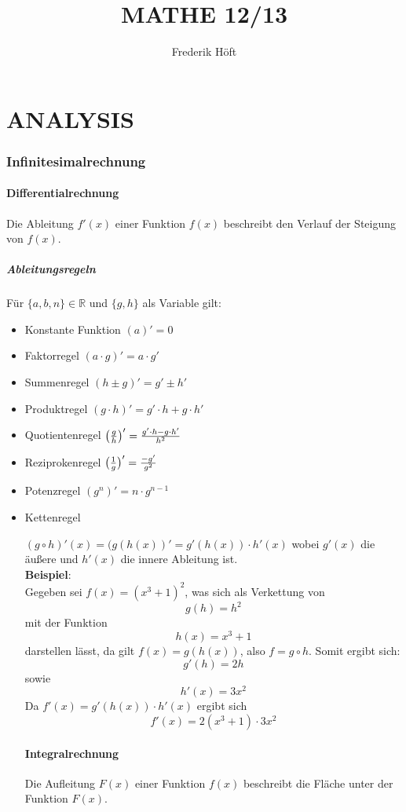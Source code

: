 \documentclass[a4paper,12pt]{article}
\begin{document}
\author{Frederik Höft}
\title{MATHE 12/13}
\maketitle
\pagebreak
\tableofcontents{}
\pagebreak
\part{ANALYSIS}
\section{Infinitesimalrechnung}
\subsection{Differentialrechnung}
Die Ableitung $f'(x)$ einer Funktion $f(x)$ beschreibt den Verlauf der Steigung von $f(x)$.
\subsubsection{Ableitungsregeln}
Für $\{a,b,n\} \in \mathbb{R}$ und $\{g,h\}$ als Variable gilt:
\begin{itemize}
\item Konstante Funktion
	\subitem $(a)' = 0$
\item Faktorregel
	\subitem $(a \cdot g)' = a \cdot g'$
\item Summenregel
	\subitem $(h \pm g)' = g' \pm h'$
\item Produktregel
	\subitem $(g \cdot h)' = g' \cdot h + g \cdot h'$
\item Quotientenregel
	\subitem $\big{(}\frac{g}{h}\big{)}' = \frac{g' \cdot h - g \cdot h'}{h^2}$
\item Reziprokenregel
	\subitem $\big{(}\frac{1}{g}\big{)}' = \frac{-g'}{g^2}$
\item Potenzregel
	\subitem $(g^n)' = n \cdot g^{n-1}$
\item Kettenregel
	\subitem \parbox[t]{\linewidth}{$(g \circ h)'(x) = (g(h(x))' = g'(h(x)) \cdot h'(x)$
		wobei $g'(x)$ die äußere und $h'(x)$ die innere Ableitung ist.\\
		\textbf{Beispiel}:\\
		Gegeben sei $f(x) = (x^3 + 1)^2$, was sich als Verkettung von
		$$g(h) = h^2$$
		mit der Funktion
		$$h(x) = x^3 + 1$$
		darstellen lässt, da gilt $f(x) = g(h(x))$, also $f = g \circ h$. Somit ergibt sich:
		$$g'(h) = 2h$$
		sowie
		$$h'(x) = 3x^2$$
		Da $f'(x) = g'(h(x)) \cdot h'(x)$ ergibt sich
		$$f'(x) = 2(x^3 + 1) \cdot 3x^2$$}
\subsection{Integralrechnung}
Die Aufleitung $F(x)$ einer Funktion $f(x)$ beschreibt die Fläche unter der Funktion $F(x)$.
\end{itemize}
\end{document}
